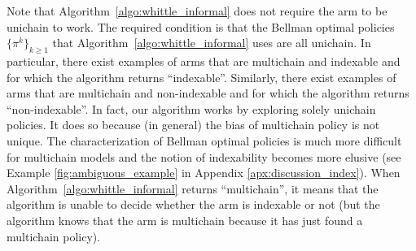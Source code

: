 Note that Algorithm~\ref{algo:whittle_informal} does not require the arm to be unichain to work.
The required condition is that the Bellman optimal policies $\{\pi^k\}_{k\ge1}$ that Algorithm~\ref{algo:whittle_informal} uses are all unichain.
In particular, there exist examples of arms that are multichain and indexable and for which the algorithm returns ``indexable''.
Similarly, there exist examples of arms that are multichain and non-indexable and for which the algorithm returns ``non-indexable''.
In fact, our algorithm works by exploring solely unichain policies. It does so because (in general) the bias of  multichain policy is not unique.
The characterization of Bellman optimal policies is much more difficult for multichain models and the notion of indexability becomes more elusive (see Example \ref{fig:ambiguous_example} in Appendix \ref{apx:discussion_index}).
When Algorithm~\ref{algo:whittle_informal} returns ``multichain'', it means that the algorithm is unable to decide whether the arm is indexable or not (but the algorithm knows that the arm is multichain because it has just found a multichain policy).

